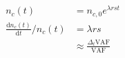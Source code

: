\documentclass[10pt]{article}
\begin{document}
\begin{align*}n_c(t)&=n_{c,0}e^{\lambda rst}\\
\frac{\mathrm{d} n_c(t)}{\mathrm{d}t} \Big/ n_c(t) &=\lambda rs \\
&\approx \frac{\Delta_t\mathrm{VAF}}{\mathrm{VAF}}\end{align*}
\end{document}
